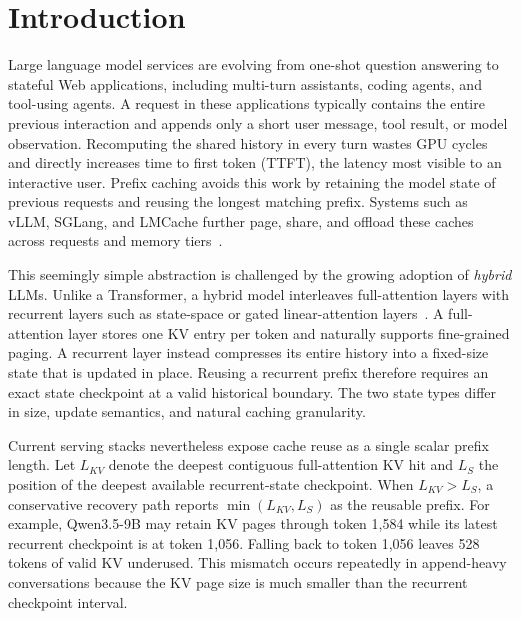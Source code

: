 \documentclass[sigconf,anonymous,review]{acmart}
\begin{document}

\maketitle

\section{Introduction}

Large language model services are evolving from one-shot question answering
to stateful Web applications, including multi-turn assistants, coding agents,
and tool-using agents.  A request in these applications typically contains the
entire previous interaction and appends only a short user message, tool result,
or model observation.  Recomputing the shared history in every turn wastes GPU
cycles and directly increases time to first token (TTFT), the latency most
visible to an interactive user.  Prefix caching avoids this work by retaining
the model state of previous requests and reusing the longest matching prefix.
Systems such as vLLM, SGLang, and LMCache further page, share, and offload these
caches across requests and memory tiers~\cite{kwon2023vllm,zheng2024sglang,cheng2025lmcache}.

This seemingly simple abstraction is challenged by the growing adoption of
\emph{hybrid} LLMs.  Unlike a Transformer, a hybrid model interleaves
full-attention layers with recurrent layers such as state-space or gated
linear-attention layers~\cite{gu2024mamba,pan2025marconi}.  A full-attention
layer stores one KV entry per token and naturally supports fine-grained paging.
A recurrent layer instead compresses its entire history into a fixed-size
state that is updated in place.  Reusing a recurrent prefix therefore requires
an exact state checkpoint at a valid historical boundary.  The two state types
differ in size, update semantics, and natural caching granularity.

Current serving stacks nevertheless expose cache reuse as a single scalar
prefix length.  Let $L_{KV}$ denote the deepest contiguous full-attention KV
hit and $L_S$ the position of the deepest available recurrent-state checkpoint.
When $L_{KV} > L_S$, a conservative recovery path reports
$\min(L_{KV},L_S)$ as the reusable prefix.  For example, Qwen3.5-9B may retain
KV pages through token 1,584 while its latest recurrent checkpoint is at token
1,056.  Falling back to token 1,056 leaves 528 tokens of valid KV underused.
This mismatch occurs repeatedly in append-heavy conversations because the KV
page size is much smaller than the recurrent checkpoint interval.
\end{document}
